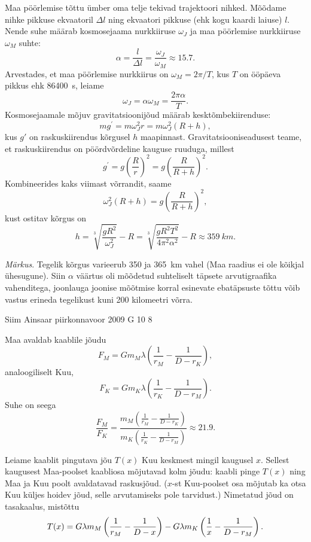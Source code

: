 \documentclass[11pt]{article}
\begin{document}
{{\ifSolution
Maa pöörlemise tõttu ümber oma telje tekivad trajektoori nihked. Mõõdame nihke pikkuse ekvaatoril $\Delta l$ ning ekvaatori pikkuse (ehk kogu kaardi laiuse) $l$. Nende suhe määrab kosmosejaama nurkkiiruse $\omega_J$ ja maa pöörlemise nurkkiiruse $\omega_M$ suhte:
\[
\alpha=\frac{l}{\Delta l}=\frac{\omega_{J}}{\omega_{M}} \approx \num{15,7}.
\]
Arvestades, et maa pöörlemise nurkkiirus on $\omega_M = 2\pi /T$, kus $T$ on ööpäeva pikkus ehk \SI{86400}{s}, leiame
\[
\omega_J = \alpha \omega_M = \frac{2\pi\alpha}{T}.
\]
Kosmosejaamale mõjuv gravitatsioonijõud määrab kesktõmbekiirenduse:
\[
m g^{\prime}= m\omega_J^2 r = m \omega_{J}^{2}(R+h),
\]
kus $g'$ on raskuskiirendus kõrgusel $h$ maapinnast. Gravitatsiooniseadusest teame, et raskuskiirendus on pöördvõrdeline kauguse ruuduga, millest
\[
g^{\prime}= g\left(\frac{R}{r}\right)^2 = g\left(\frac{R}{R+h}\right)^{2}.
\]
Kombineerides kaks viimast võrrandit, saame
\[
\omega_{J}^{2}(R+h)=g\left(\frac{R}{R+h}\right)^{2},
\]
kust ostitav kõrgus on
\[
h=\sqrt[3]{\frac{g R^{2}}{\omega_{J}^{2}}}-R=\sqrt[3]{\frac{g R^{2} T^{2}}{4 \pi^{2} \alpha^{2}}}-R \approx \SI{359}{km}.
\]

\emph{Märkus}. Tegelik kõrgus varieerub \num{350} ja \SI{365}{km} vahel (Maa raadius ei ole kõikjal ühesugune). Siin $\alpha$ väärtus oli mõõdetud suhteliselt täpsete arvutigraafika vahenditega, joonlauga joonise mõõtmise korral esinevate ebatäpsuste tõttu võib vastus erineda tegelikust kuni \num{200} kilomeetri võrra. 
\fi
}

{Siim Ainsaar} %
{piirkonnavoor} %
{2009} %
{G 10} %
{8} %
{

\ifSolution
\osa
Maa avaldab kaablile jõudu
\[ 
F_M = G m_M \lambda \left( \frac{1}{r_M} - \frac{1}{D - r_K} \right),
\]
analoogiliselt Kuu,
\[ 
F_K = G m_K \lambda \left( \frac{1}{r_K} - \frac{1}{D - r_M} \right).
\]
Suhe on seega
\[ \frac{F_M}{F_K} = \frac{ m_M \left( \frac{1}{r_M} - \frac{1}{D -
		r_K} \right) }{ m_K \left( \frac{1}{r_K} - \frac{1}{D - r_M} \right) } \approx
\num{21,9}.\]

\osa
Leiame kaablit pingutava jõu $T(x)$ Kuu keskmest mingil kaugusel $x$. Sellest
kaugusest Maa-poolset kaabliosa mõjutavad kolm jõudu: kaabli pinge $T(x)$ ning
Maa ja Kuu poolt avaldatavad raskusjõud. ($x$-st Kuu-poolset osa mõjutab ka
otsa Kuu küljes hoidev jõud, selle arvutamiseks pole tarvidust.) Nimetatud jõud on
tasakaalus, mistõttu
\[ 
T(x) = G\lambda m_M \left( \frac{1}{r_M} - \frac{1}{D-x} \right) -
G\lambda m_K \left( \frac{1}{x} - \frac{1}{D-r_M} \right) \text. 
\]

}}
\end{document}
